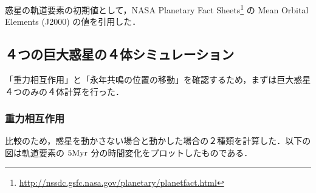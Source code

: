 \documentclass[11pt,a4paper,oneside,onecolumn]{jreport}
\begin{document}
惑星の軌道要素の初期値として，NASA Planetary Fact Sheets\footnote{\url{http://nssdc.gsfc.nasa.gov/planetary/planetfact.html}} の Mean Orbital Elements (J2000) の値を引用した．


\subsection{４つの巨大惑星の４体シミュレーション}
「重力相互作用」と「永年共鳴の位置の移動」を確認するため，まずは巨大惑星４つのみの４体計算を行った．
\subsubsection{重力相互作用}
比較のため，惑星を動かさない場合と動かした場合の２種類を計算した．以下の図は軌道要素の $5 {\rm Myr}$ 分の時間変化をプロットしたものである．
\end{document}
